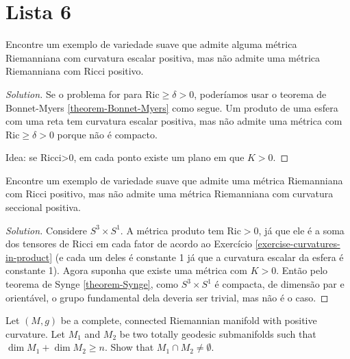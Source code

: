 \section{Lista 6}
\label{section-lista-6}

\begin{exercise}
\label{exercise-positive-scalar-but-no-positive-Ricci}
Encontre um exemplo de variedade suave que admite alguma métrica Riemanniana com
curvatura escalar positiva, mas não admite uma métrica Riemanniana com Ricci
positivo.
\end{exercise}

\begin{proof}[Solution]
Se o problema for para $\text{Ric}\geq \delta>0$, poderíamos usar o teorema de 
Bonnet-Myers \ref{theorem-Bonnet-Myers} como segue. Um produto de uma esfera com
uma reta tem curvatura escalar positiva, mas não admite uma métrica com 
$\text{Ric}\geq\delta>0$ porque não é compacto.

Idea: se Ricci>0, em cada ponto existe um plano em que $K>0$.
\end{proof}

\begin{exercise}
\label{exercise-positive-Ricci-but-no-positive-sectional}
Encontre um exemplo de variedade suave que admite uma métrica Riemanniana com
Ricci positivo, mas não admite uma métrica Riemanniana com curvatura seccional
positiva.
\end{exercise}

\begin{proof}[Solution]
Considere $S^3\times S^1$. A métrica produto tem $\text{Ric}>0$, já que ele é a
soma dos tensores de Ricci em cada fator de acordo ao Exercício 
\ref{exercise-curvatures-in-product} (e cada um deles é constante 1 já que a 
curvatura escalar da esfera é constante 1). Agora suponha que existe uma métrica
com $K>0$. Então pelo teorema de Synge \ref{theorem-Synge}, como
$S^3\times S^1$ é compacta, de dimensão par e orientável, o grupo fundamental
dela deveria ser trivial, mas não é o caso.
\end{proof}

\begin{exercise}
\label{exercise-two-totally-geodesic-submanifolds}
Let $(M,g)$ be a complete, connected Riemannian manifold with positive
curvature. Let $M_1$ and $M_2$ be two totally geodesic submanifolds such that
$\dim M_1+\dim M_2\geq n$. Show that $M_1\cap M_2\neq \emptyset$.
\end{exercise}

